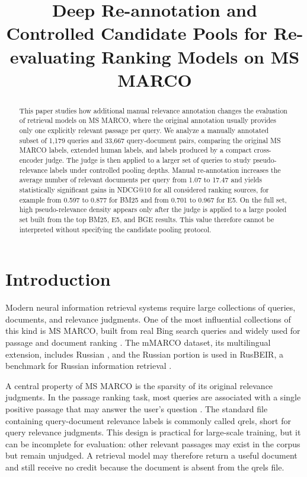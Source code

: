 \documentclass[runningheads,a4paper]{llncs}
\title{Deep Re-annotation and Controlled Candidate Pools for Re-evaluating Ranking Models on MS MARCO}
\author{}
\institute{}
\begin{document}
\maketitle
\begin{abstract}
This paper studies how additional manual relevance annotation changes the evaluation of retrieval models on MS MARCO, where the original annotation usually provides only one explicitly relevant passage per query. We analyze a manually annotated subset of 1,179 queries and 33,667 query-document pairs, comparing the original MS MARCO labels, extended human labels, and labels produced by a compact cross-encoder judge. The judge is then applied to a larger set of queries to study pseudo-relevance labels under controlled pooling depths. Manual re-annotation increases the average number of relevant documents per query from 1.07 to 17.47 and yields statistically significant gains in NDCG@10 for all considered ranking sources, for example from 0.597 to 0.877 for BM25 and from 0.701 to 0.967 for E5. On the full set, high pseudo-relevance density appears only after the judge is applied to a large pooled set built from the top BM25, E5, and BGE results. This value therefore cannot be interpreted without specifying the candidate pooling protocol.

\end{abstract}

\section{Introduction}

Modern neural information retrieval systems require large collections of queries, documents, and relevance judgments. One of the most influential collections of this kind is MS MARCO, built from real Bing search queries and widely used for passage and document ranking \cite{bajaj2016msmarco}. The mMARCO dataset, its multilingual extension, includes Russian \cite{bonifacio2022mmarco}, and the Russian portion is used in RusBEIR, a benchmark for Russian information retrieval \cite{2025rusbeir}.

A central property of MS MARCO is the sparsity of its original relevance judgments. In the passage ranking task, most queries are associated with a single positive passage that may answer the user's question \cite{msmarco_datasets}. The standard file containing query-document relevance labels is commonly called qrels, short for query relevance judgments. This design is practical for large-scale training, but it can be incomplete for evaluation: other relevant passages may exist in the corpus but remain unjudged. A retrieval model may therefore return a useful document and still receive no credit because the document is absent from the qrels file.
\end{document}
